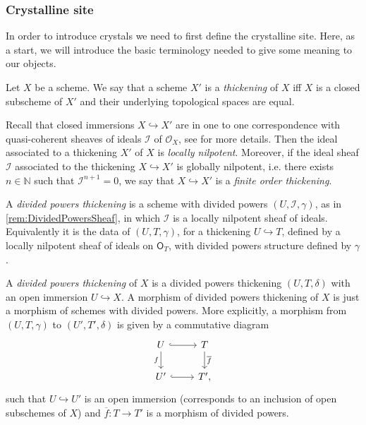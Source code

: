 \documentclass[../Main]{subfiles}
\begin{document}
\subsubsection{Crystalline site}
In order to introduce crystals we need to first define the crystalline site.
Here, as a start, we will introduce the basic terminology needed to give
some meaning to our objects.


\begin{defn}[Thickening]
	Let $X$ be a scheme.
	We say that a scheme $X'$ is a {\em thickening} of $X$ iff
	$X$ is a closed subscheme of $X'$ and their underlying topological
	spaces are equal.
\end{defn}


\begin{rem}[]
	Recall that closed immersions $X \hookrightarrow X'$ are in one to
	one correspondence with quasi-coherent sheaves of ideals
	$\mathcal{I}$ of $\mathcal{O}_{ X }$, see
	\cite[\href{https://stacks.math.columbia.edu/tag/01QN}{Section 01QN}]{SP}
	for more details.
	Then the ideal associated to a thickening $X'$ of $X$ 
	is {\em locally nilpotent}.
	Moreover, if the ideal sheaf $\mathcal{I}$ associated to the thickening
	$X \hookrightarrow X'$ is globally nilpotent, i.e. there exists $n \in \mathbb{N}$
	such that $\mathcal{I}^{n+1} = 0$, we say that $X \hookrightarrow X'$ 
	is a {\em finite order thickening}.
\end{rem}


\begin{defn}
	A {\em divided powers thickening} is a scheme with divided powers
	$\left(U, \mathcal{I}, \gamma\right)$, as in \cref{rem:DividedPowersSheaf},
	in which $\mathcal{I}$ is a locally nilpotent sheaf of ideals.
	Equivalently it is the data of $\left(U, T, \gamma\right)$,
	for a thickening $U \hookrightarrow T$, defined by a locally nilpotent
	sheaf of ideals on $\mathsf{O}_T$, with divided powers structure
	defined by $\gamma$.
\end{defn}


\begin{defn}[]
	A {\em divided powers thickening} of $X$
	is a divided powers thickening $\left(U, T, \delta\right)$
	with an open immersion $U \hookrightarrow X$.
	A morphism of divided powers thickening of $X$ is just
	a morphism of schemes with divided powers.
	More explicitly, a morphism from $\left(U, T, \gamma\right)$
	to $\left(U', T', \delta\right)$ is given by a commutative
	diagram
	\begin{equation}\label{diag:MorphDivPowers}
	\begin{tikzcd}
		U \arrow[d, "f"', rightarrow] \arrow[r, "", hookrightarrow] &
		T \arrow[d, "\overline{f}", rightarrow] \\
		U' \arrow[r, "", hookrightarrow] &
		T'
	,\end{tikzcd}
	\end{equation}
	such that $U \hookrightarrow U'$ is an open immersion (corresponds to
	an inclusion of open subschemes of $X$) and
	$\overline{f}\colon T \to T'$ is a morphism of divided powers.
\end{defn}
\end{document}
